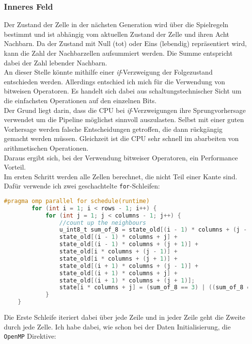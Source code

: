 \documentclass[german,plainarticle,hyperref,utf8]{zihpub}
\begin{document}
	\subsubsection{Inneres Feld}
	Der Zustand der Zelle in der nächsten Generation wird über die Spielregeln bestimmt und ist abhängig vom aktuellen Zustand der Zelle und ihren Acht Nachbarn. Da der Zustand mit Null (tot) oder Eins (lebendig) repräsentiert wird, kann die Zahl der Nachbarzellen aufsummiert werden. Die Summe entspricht dabei der Zahl lebender Nachbarn.\\
	An dieser Stelle könnte mithilfe einer \textit{if}-Verzweigung der Folgezustand entschieden werden. Allerdings entschied ich mich für die Verwendung von bitweisen Operatoren. Es handelt sich dabei aus schaltungstechnischer Sicht um die einfachsten Operationen auf den einzelnen Bits.\\
	Der Grund liegt darin, dass die CPU bei \textit{if}-Verzweigungen ihre Sprungvorhersage verwendet um die Pipeline möglichst sinnvoll auszulasten. Selbst mit einer guten Vorhersage werden falsche Entscheidungen getroffen, die dann rückgängig gemacht werden müssen. Gleichzeit ist die CPU sehr schnell im abarbeiten von arithmetischen Operationen.\\
	Daraus ergibt sich, bei der Verwendung bitweiser Operatoren, ein Performance Vorteil.\\
	
	Im ersten Schritt werden alle Zellen berechnet, die nicht Teil einer Kante sind. Dafür verwende ich zwei geschachtelte \texttt{for}-Schleifen:\\
	\begin{lstlisting}[language=C, caption=Berechnung der inneren Zellen]
		#pragma omp parallel for schedule(runtime)
		for (int i = 1; i < rows - 1; i++) {
			for (int j = 1; j < columns - 1; j++) {
				//count up the neighbours
				u_int8_t sum_of_8 = state_old[(i - 1) * columns + (j - 1)] +
				state_old[(i - 1) * columns + j] +
				state_old[(i - 1) * columns + (j + 1)] +
				state_old[i * columns + (j - 1)] +
				state_old[i * columns + (j + 1)] +
				state_old[(i + 1) * columns + (j - 1)] +
				state_old[(i + 1) * columns + j] +
				state_old[(i + 1) * columns + (j + 1)];
				state[i * columns + j] = (sum_of_8 == 3) | ((sum_of_8 == 2) & state_old[i * columns + j]);
			}
	}	\end{lstlisting}
	
	Die Erste Schleife iteriert dabei über jede Zeile und in jeder Zeile geht die Zweite durch jede Zelle. Ich habe dabei, wie schon bei der Daten Initialisierung, die \texttt{OpenMP} Direktive:\\
	
\end{document}
